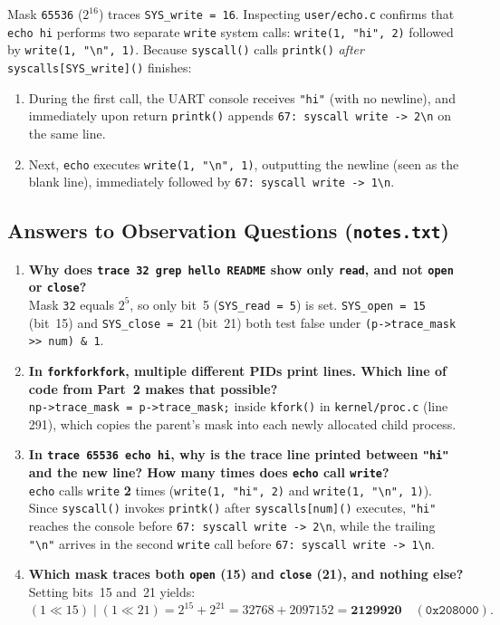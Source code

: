 \documentclass[12pt,a4paper]{article}
\begin{document}
Mask \texttt{65536} ($2^{16}$) traces \texttt{SYS\_write = 16}. Inspecting \texttt{user/echo.c} confirms that \texttt{echo hi} performs two separate \texttt{write} system calls: \texttt{write(1, "hi", 2)} followed by \texttt{write(1, "\textbackslash n", 1)}. Because \texttt{syscall()} calls \texttt{printk()} \emph{after} \texttt{syscalls[SYS\_write]()} finishes:
\begin{enumerate}
    \item During the first call, the UART console receives \texttt{"hi"} (with no newline), and immediately upon return \texttt{printk()} appends \texttt{67: syscall write -> 2\textbackslash n} on the same line.
    \item Next, \texttt{echo} executes \texttt{write(1, "\textbackslash n", 1)}, outputting the newline (seen as the blank line), immediately followed by \texttt{67: syscall write -> 1\textbackslash n}.
\end{enumerate}

\subsection{Answers to Observation Questions (\texttt{notes.txt})}
\begin{enumerate}
    \item \textbf{Why does \texttt{trace 32 grep hello README} show only \texttt{read}, and not \texttt{open} or \texttt{close}?} \\
    Mask \texttt{32} equals $2^5$, so only bit~5 (\texttt{SYS\_read = 5}) is set. \texttt{SYS\_open = 15} (bit~15) and \texttt{SYS\_close = 21} (bit~21) both test false under \texttt{(p->trace\_mask >{}> num) \& 1}.
    \item \textbf{In \texttt{forkforkfork}, multiple different PIDs print lines. Which line of code from Part~2 makes that possible?} \\
    \texttt{np->trace\_mask = p->trace\_mask;} inside \texttt{kfork()} in \texttt{kernel/proc.c} (line 291), which copies the parent's mask into each newly allocated child process.
    \item \textbf{In \texttt{trace 65536 echo hi}, why is the trace line printed between \texttt{"hi"} and the new line? How many times does \texttt{echo} call \texttt{write}?} \\
    \texttt{echo} calls \texttt{write} \textbf{2} times (\texttt{write(1, "hi", 2)} and \texttt{write(1, "\textbackslash n", 1)}). Since \texttt{syscall()} invokes \texttt{printk()} after \texttt{syscalls[num]()} executes, \texttt{"hi"} reaches the console before \texttt{67: syscall write -> 2\textbackslash n}, while the trailing \texttt{"\textbackslash n"} arrives in the second \texttt{write} call before \texttt{67: syscall write -> 1\textbackslash n}.
    \item \textbf{Which mask traces both \texttt{open} (15) and \texttt{close} (21), and nothing else?} \\
    Setting bits~15 and~21 yields:
    \[
        (1 \ll 15) \mid (1 \ll 21) = 2^{15} + 2^{21} = 32768 + 2097152 = \mathbf{2129920} \quad (\texttt{0x208000}).
    \]
\end{enumerate}
\end{document}
